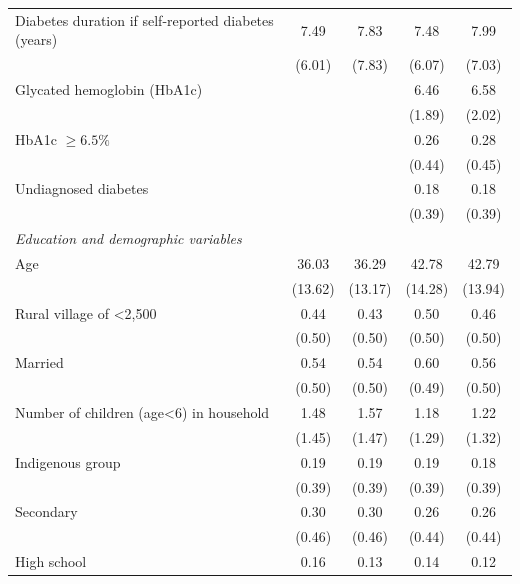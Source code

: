 \begin{table}
\begin{adjustbox}{max width=0.9\textwidth, center}
\begin{threeparttable}
{\begin{tabular}{l*{4}{c}}
Diabetes duration if self-reported diabetes (years)   &        7.49&        7.83&        7.48&        7.99\\
                    &      (6.01)&      (7.83)&      (6.07)&      (7.03)\\
Glycated hemoglobin (HbA1c)&            &            &       6.46&        6.58\\
                    &            &            &      (1.89)&      (2.02)\\
HbA1c $\geq 6.5\%$  &            &            &        0.26&        0.28\\
                    &            &            &      (0.44)&      (0.45)\\
Undiagnosed diabetes&            &            &        0.18&        0.18\\
                    &            &            &      (0.39)&      (0.39)\\
\hspace*{10mm}\emph{Education and demographic variables} \\
Age                 &       36.03&       36.29&       42.78&       42.79\\
                    &     (13.62)&     (13.17)&     (14.28)&     (13.94)\\
Rural village of <2,500&        0.44&        0.43&        0.50&        0.46\\
                    &      (0.50)&      (0.50)&      (0.50)&      (0.50)\\
Married             &        0.54&        0.54&        0.60&        0.56\\
                    &      (0.50)&      (0.50)&      (0.49)&      (0.50)\\
Number of children (age<6) in household&        1.48&        1.57&        1.18&        1.22\\
                    &      (1.45)&      (1.47)&      (1.29)&      (1.32)\\
Indigenous group    &        0.19&        0.19&        0.19&        0.18\\
                    &      (0.39)&      (0.39)&      (0.39)&      (0.39)\\
Secondary           &        0.30&        0.30&        0.26&        0.26\\
                    &      (0.46)&      (0.46)&      (0.44)&      (0.44)\\
High school         &        0.16&        0.13&        0.14&        0.12\\

\end{tabular}}
\end{threeparttable}
\end{adjustbox}
\end{table}
